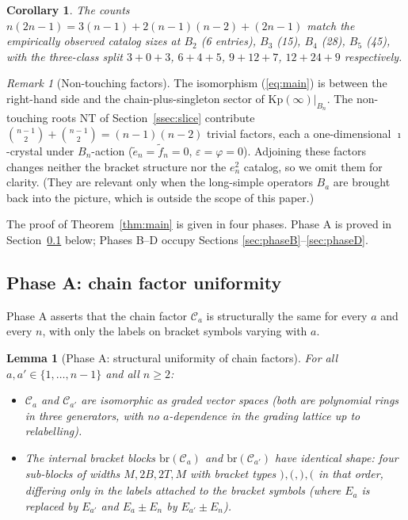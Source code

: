 \documentclass[11pt]{article}
\newtheorem{lemma}[theorem]{Lemma}
\newtheorem{corollary}[theorem]{Corollary}
\theoremstyle{definition}
\theoremstyle{remark}
\newtheorem{remark}[theorem]{Remark}
\newcommand{\Kp}{\mathrm{Kp}}
\newcommand{\NT}{\mathrm{NT}}
\newcommand{\Cmid}{\mathcal{C}}
\newcommand{\br}{\mathrm{br}}
\newcommand{\labr}[1]{{)}_{#1}}
\newcommand{\labl}[1]{{(}_{#1}}
\begin{document}
\begin{corollary}\label{cor:catalog}
The counts $n(2n-1) = 3(n-1) + 2(n-1)(n-2) + (2n-1)$ match the empirically observed catalog
sizes at $B_2$ (6 entries), $B_3$ (15), $B_4$ (28), $B_5$ (45), with the three-class split
$3 + 0 + 3$, $6 + 4 + 5$, $9 + 12 + 7$, $12 + 24 + 9$ respectively.
\end{corollary}

\begin{remark}[Non-touching factors]\label{rmk:non-touching}
The isomorphism (\ref{eq:main}) is between the right-hand side and the chain-plus-singleton
sector of $\Kp(\infty)|_{B_n}$. The non-touching roots $\NT$ of Section~\ref{ssec:slice}
contribute $\binom{n-1}{2} + \binom{n-1}{2} = (n-1)(n-2)$ trivial factors, each a one-dimensional
$\imath$-crystal under $B_n$-action ($\tilde e_n = \tilde f_n = 0$, $\varepsilon = \varphi
= 0$). Adjoining these factors changes neither the bracket structure nor the $e_n^2$ catalog,
so we omit them for clarity. (They are relevant only when the long-simple operators $B_a$ are
brought back into the picture, which is outside the scope of this paper.)
\end{remark}

The proof of Theorem~\ref{thm:main} is given in four phases. Phase A is proved in
Section~\ref{ssec:phaseA} below; Phases B--D occupy Sections \ref{sec:phaseB}--\ref{sec:phaseD}.

\subsection{Phase A: chain factor uniformity}\label{ssec:phaseA}

Phase A asserts that the chain factor $\Cmid_a$ is structurally the same for every $a$ and
every $n$, with only the labels on bracket symbols varying with $a$.

\begin{lemma}[Phase A: structural uniformity of chain factors]\label{lem:phaseA}
For all $a, a' \in \{1, \ldots, n-1\}$ and all $n \geq 2$:
\begin{itemize}[leftmargin=2em]
  \item[(i)] $\Cmid_a$ and $\Cmid_{a'}$ are isomorphic as graded vector spaces (both are
    polynomial rings in three generators, with no $a$-dependence in the grading lattice up to
    relabelling).
  \item[(ii)] The internal bracket blocks $\br(\Cmid_a)$ and $\br(\Cmid_{a'})$ have identical
    shape: four sub-blocks of widths $M, 2B, 2T, M$ with bracket types $\labr{}, \labl{},
    \labr{}, \labl{}$ in that order, differing only in the labels attached to the bracket
    symbols (where $E_a$ is replaced by $E_{a'}$ and $E_a \pm E_n$ by $E_{a'} \pm E_n$).
\end{itemize}
\end{lemma}
\end{document}
